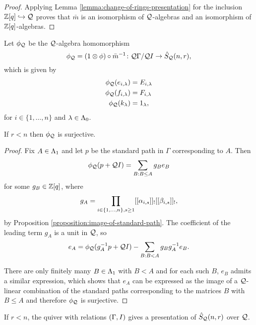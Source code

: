 \documentclass[a4paper, 11pt]{report}
\begin{document}
\begin{proof}
Applying Lemma \ref{lemma:change-of-rings-presentation} for the inclusion $\mathbb{Z}[q]\hookrightarrow\mathcal{Q}$ proves that $\bar{m}$ is an isomorphism of $\mathcal{Q}$-algebras and an isomorphism of $\mathbb{Z}[q]$-algebras.
\end{proof}

Let $\phi_{\mathcal{Q}}$ be the $\mathcal{Q}$-algebra homomorphism
\begin{equation*}
\phi_{\mathcal{Q}}=(1\otimes \phi)\circ \bar{m}^{-1}\colon \mathcal{Q}\Gamma/{\mathcal{Q} I}\to\hat{S}_{\mathcal{Q}}(n,r),
\end{equation*}
which is given by
\begin{align*}
\phi_{\mathcal{Q}}(e_{i,\lambda}) &= E_{i,\lambda}\\
\phi_{\mathcal{Q}}(f_{i,\lambda}) &= F_{i,\lambda}\\
\phi_{\mathcal{Q}}(k_\lambda) &= 1_\lambda,
\end{align*}
for $i\in\{1,\ldots,n\}$ and $\lambda\in\Lambda_0{}$.

\begin{proposition}\label{proposition:q-schur-presentation}
If $r<n$ then $\phi_{\mathcal{Q}}$ is surjective.
\end{proposition}

\begin{proof}
Fix $A\in\Lambda_1{}$ and let $p$ be the standard path in $\Gamma$ corresponding to $A$. Then
\begin{equation*}
\phi_{\mathcal{Q}}(p+\mathcal{Q} I) = \sum_{B:B\le A} g_Be_B
\end{equation*}
for some $g_B\in\mathbb{Z}[q]$, where
\begin{equation*}
g_A = \prod_{i\in\{1,\ldots,n\},s\geq 1}[[\alpha_{i,s}]]_![[\beta_{i,s}]]_!,
\end{equation*}
by Proposition \ref{proposition:image-of-standard-path}. The coefficient of the leading term $g_A$ is a unit in $\mathcal{Q}$, so
\begin{equation*}
e_A = \phi_{\mathcal{Q}}(g_A^{-1}p+\mathcal{Q} I) - \sum_{B:B<A} g_Bg_A^{-1} e_B.
\end{equation*}

There are only finitely many $B\in\Lambda_1{}$ with $B<A$ and for each such $B$, $e_B$ admits a similar expression, which shows that $e_A$ can be expressed as the image of a $\mathcal{Q}$-linear combination of the standard paths corresponding to the matrices $B$ with $B\le A$ and therefore $\phi_{\mathcal{Q}}$ is surjective.
\end{proof}

\begin{conjecture}
If $r<n$, the quiver with relations $(\Gamma,I)$ gives a presentation of $\hat{S}_{\mathcal{Q}}(n,r)$ over $\mathcal{Q}$.
\end{conjecture}
\end{document}

